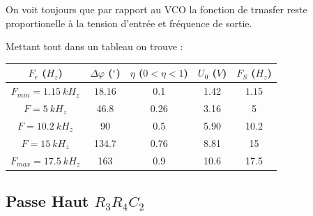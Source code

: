 \documentclass[11pt, openright]{book}
\begin{document}
\begin{center}
\end{center}

On voit toujours que par rapport au VCO la fonction de trnasfer reste proportionelle à la tension d'entrée et fréquence de sortie.

Mettant tout dans un tableau on trouve :
\begin{center}
    \begin{tabular}{c|c|c|c|c}
        $F_e$ ($H_z$)          & $\Delta \varphi$ ($^{\circ}$) & $\eta$ ($0<\eta<1$) & $U_0$ ($V$) & $F_S$ ($H_z$) \\
        \hline
        $F_{min} = 1.15\ kH_z$ & $18.16$                       & 0.1                 & 1.42        & $1.15$        \\
        \hline
        $F=5\ kH_z$            & 46.8                          & 0.26                & 3.16        & 5             \\
        \hline
        $F=10.2\ kH_z$         & 90                            & 0.5                 & 5.90        & 10.2          \\
        \hline
        $F=15\ kH_z$           & 134.7                         & 0.76                & 8.81        & 15            \\
        \hline
        $F_{max}=17.5\ kH_z$   & 163                           & 0.9                 & 10.6        & 17.5
    \end{tabular}
\end{center}

\subsection{Passe Haut $R_3R_4C_2$}
\end{document}
